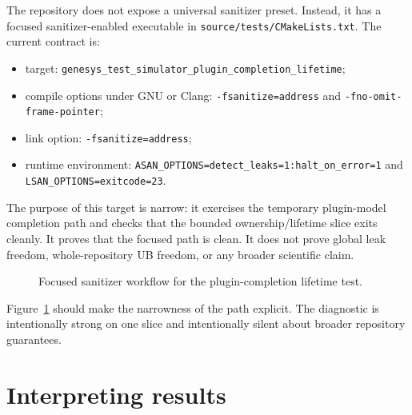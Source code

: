 The repository does not expose a universal sanitizer preset. Instead, it has a
focused sanitizer-enabled executable in \texttt{source/tests/CMakeLists.txt}.
The current contract is:
\begin{itemize}
\item target: \texttt{genesys\_test\_simulator\_plugin\_completion\_lifetime};
\item compile options under GNU or Clang: \texttt{-fsanitize=address} and
\texttt{-fno-omit-frame-pointer};
\item link option: \texttt{-fsanitize=address};
\item runtime environment:
\texttt{ASAN\_OPTIONS=detect\_leaks=1:halt\_on\_error=1} and
\texttt{LSAN\_OPTIONS=exitcode=23}.
\end{itemize}

The purpose of this target is narrow: it exercises the temporary plugin-model
completion path and checks that the bounded ownership/lifetime slice exits
cleanly. It proves that the focused path is clean. It does not prove global
leak freedom, whole-repository UB freedom, or any broader scientific claim.

\begin{figure}[htbp]
\centering
\caption{Focused sanitizer workflow for the plugin-completion lifetime test.}
\label{fig:sanitizer-workflow}
\end{figure}

Figure~\ref{fig:sanitizer-workflow} should make the narrowness of the path
explicit. The diagnostic is intentionally strong on one slice and intentionally
silent about broader repository guarantees.

\section{Interpreting results}
\label{sec:test-result-interpretation}

